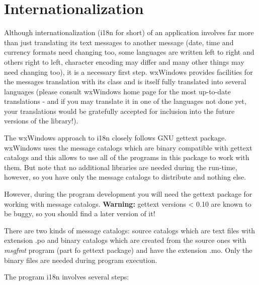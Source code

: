 \section{Internationalization}\label{internationalization}

Although internationalization (i18n for short) of an application involves far
more than just translating its text messages to another message (date, time and
currency formats need changing too, some languages are written left to right
and others right to left, character encoding may differ and many other things
may need changing too), it is a necessary first step. wxWindows provides
facilities for the messages translation with its 
 class and is itself fully translated into several
languages (please consult wxWindows home page for the most up-to-date
translations - and if you may translate it in one of the languages not done
yet, your translations would be gratefully accepted for inclusion into the
future versions of the library!).

The wxWindows approach to i18n closely follows GNU gettext package. wxWindows uses the
message catalogs which are binary compatible with gettext catalogs and this
allows to use all of the programs in this package to work with them. But note
that no additional libraries are needed during the run-time, however, so you
have only the message catalogs to distribute and nothing else.

However, during the program development you will need the gettext package for
working with message catalogs. {\bf Warning:} gettext versions < 0.10 are known
to be buggy, so you should find a later version of it!

There are two kinds of message catalogs: source catalogs which are text files
with extension .po and binary catalogs which are created from the source ones
with {\it msgfmt} program (part fo gettext package) and have the extension .mo.
Only the binary files are needed during program execution.

The program i18n involves several steps:

